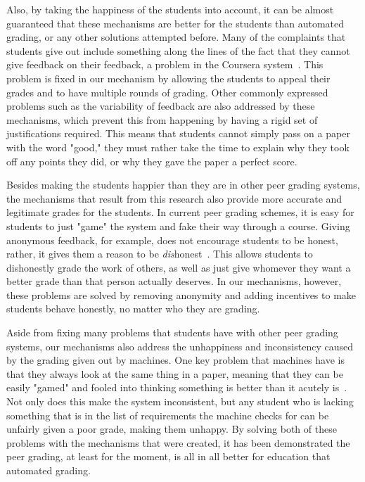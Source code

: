 \documentclass[12pt, Arial]{article}
\begin{document}
Also, by taking the happiness of the students into account, it can be almost guaranteed that these mechanisms are better for the students than automated grading, or any other solutions attempted before. Many of the complaints that students give out include something along the lines of the fact that they cannot give feedback on their feedback, a problem in the Coursera system~\cite{theproblemswithpeergradingincoursera}. This problem is fixed in our mechanism by allowing the students to appeal their grades and to have multiple rounds of grading. Other commonly expressed problems such as the variability of feedback are also addressed by these mechanisms, which prevent this from happening by having a rigid set of justifications required. This means that students cannot simply pass on a paper with the word "good," they must rather take the time to explain why they took off any points they did, or why they gave the paper a perfect score.

Besides making the students happier than they are in other peer grading systems, the mechanisms that result from this research also provide more accurate and legitimate grades for the students. In current peer grading schemes, it is easy for students to just "game" the system and fake their way through a course. Giving anonymous feedback, for example, does not encourage students to be honest, rather, it gives them a reason to be \emph{dis}honest~\cite{theproblemswithpeergradingincoursera}. This allows students to dishonestly grade the work of others, as well as just give whomever they want a better grade than that person actually deserves. In our mechanisms, however, these problems are solved by removing anonymity and adding incentives to make students behave honestly, no matter who they are grading.

Aside from fixing many problems that students have with other peer grading systems, our mechanisms also address the unhappiness and inconsistency caused by the grading given out by machines. One key problem that machines have is that they always look at the same thing in a paper, meaning that they can be easily "gamed" and fooled into thinking something is better than it acutely is~\cite{robogradingproblems}. Not only does this make the system inconsistent, but any student who is lacking something that is in the list of requirements the machine checks for can be unfairly given a poor grade, making them unhappy. By solving both of these problems with the mechanisms that were created, it has been demonstrated the peer grading, at least for the moment, is all in all better for education that automated grading.
\end{document}
